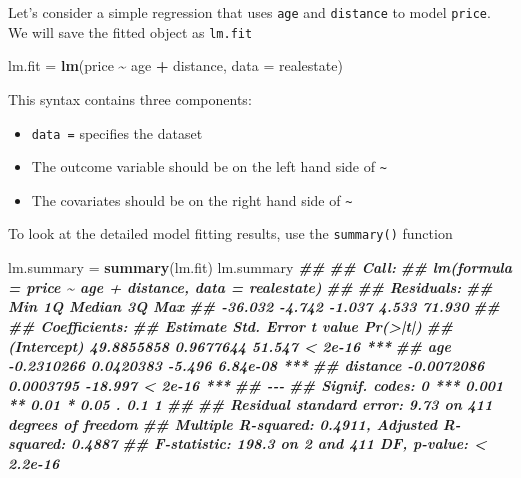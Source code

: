 \documentclass[
]{book}
\newenvironment{Shaded}{\begin{snugshade}}{\end{snugshade}}
\newcommand{\AttributeTok}[1]{\textcolor[rgb]{0.13,0.29,0.53}{#1}}
\newcommand{\DocumentationTok}[1]{\textcolor[rgb]{0.56,0.35,0.01}{\textbf{\textit{#1}}}}
\newcommand{\FunctionTok}[1]{\textcolor[rgb]{0.13,0.29,0.53}{\textbf{#1}}}
\newcommand{\NormalTok}[1]{#1}
\newcommand{\OtherTok}[1]{\textcolor[rgb]{0.56,0.35,0.01}{#1}}
\newcommand{\SpecialCharTok}[1]{\textcolor[rgb]{0.81,0.36,0.00}{\textbf{#1}}}
\providecommand{\tightlist}{%
  \setlength{\itemsep}{0pt}\setlength{\parskip}{0pt}}
\theoremstyle{definition}
\theoremstyle{definition}
\theoremstyle{definition}
\theoremstyle{definition}
\theoremstyle{remark}
\begin{document}
Let's consider a simple regression that uses \texttt{age} and \texttt{distance} to model \texttt{price}. We will save the fitted object as \texttt{lm.fit}

\begin{Shaded}
\begin{Highlighting}[]
\NormalTok{    lm.fit }\OtherTok{=} \FunctionTok{lm}\NormalTok{(price }\SpecialCharTok{\textasciitilde{}}\NormalTok{ age }\SpecialCharTok{+}\NormalTok{ distance, }\AttributeTok{data =}\NormalTok{ realestate)}
\end{Highlighting}
\end{Shaded}

This syntax contains three components:

\begin{itemize}
\tightlist
\item
  \texttt{data\ =} specifies the dataset
\item
  The outcome variable should be on the left hand side of \texttt{\textasciitilde{}}
\item
  The covariates should be on the right hand side of \texttt{\textasciitilde{}}
\end{itemize}

To look at the detailed model fitting results, use the \texttt{summary()} function

\begin{Shaded}
\begin{Highlighting}[]
\NormalTok{    lm.summary }\OtherTok{=} \FunctionTok{summary}\NormalTok{(lm.fit)}
\NormalTok{    lm.summary}
\DocumentationTok{\#\# }
\DocumentationTok{\#\# Call:}
\DocumentationTok{\#\# lm(formula = price \textasciitilde{} age + distance, data = realestate)}
\DocumentationTok{\#\# }
\DocumentationTok{\#\# Residuals:}
\DocumentationTok{\#\#     Min      1Q  Median      3Q     Max }
\DocumentationTok{\#\# {-}36.032  {-}4.742  {-}1.037   4.533  71.930 }
\DocumentationTok{\#\# }
\DocumentationTok{\#\# Coefficients:}
\DocumentationTok{\#\#               Estimate Std. Error t value Pr(\textgreater{}|t|)    }
\DocumentationTok{\#\# (Intercept) 49.8855858  0.9677644  51.547  \textless{} 2e{-}16 ***}
\DocumentationTok{\#\# age         {-}0.2310266  0.0420383  {-}5.496 6.84e{-}08 ***}
\DocumentationTok{\#\# distance    {-}0.0072086  0.0003795 {-}18.997  \textless{} 2e{-}16 ***}
\DocumentationTok{\#\# {-}{-}{-}}
\DocumentationTok{\#\# Signif. codes:  0 \textquotesingle{}***\textquotesingle{} 0.001 \textquotesingle{}**\textquotesingle{} 0.01 \textquotesingle{}*\textquotesingle{} 0.05 \textquotesingle{}.\textquotesingle{} 0.1 \textquotesingle{} \textquotesingle{} 1}
\DocumentationTok{\#\# }
\DocumentationTok{\#\# Residual standard error: 9.73 on 411 degrees of freedom}
\DocumentationTok{\#\# Multiple R{-}squared:  0.4911, Adjusted R{-}squared:  0.4887 }
\DocumentationTok{\#\# F{-}statistic: 198.3 on 2 and 411 DF,  p{-}value: \textless{} 2.2e{-}16}
\end{Highlighting}
\end{Shaded}
\end{document}

